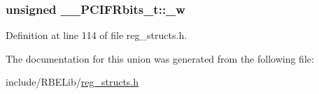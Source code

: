 \hypertarget{union_____p_c_i_f_rbits__t_adf9a3268ff2b4be98dd16f9685f6e7bf}{
\subsubsection[{\+\_\+w}]{\setlength{\rightskip}{0pt plus 5cm}unsigned \+\_\+\+\_\+\+P\+C\+I\+F\+Rbits\+\_\+t\+::\+\_\+w}}\label{union_____p_c_i_f_rbits__t_adf9a3268ff2b4be98dd16f9685f6e7bf}


Definition at line 114 of file reg\+\_\+structs.\+h.



The documentation for this union was generated from the following file\+:\begin{DoxyCompactItemize}
\item 
include/\+R\+B\+E\+Lib/\hyperlink{reg__structs_8h}{reg\+\_\+structs.\+h}\end{DoxyCompactItemize}
